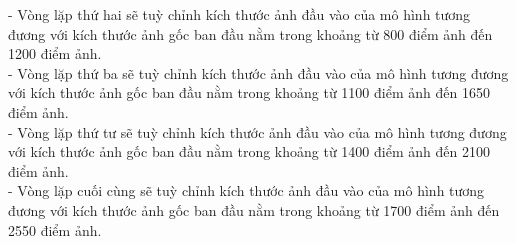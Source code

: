 {    - Vòng lặp thứ hai sẽ tuỳ chỉnh kích thước ảnh đầu vào của mô hình tương đương với kích thước ảnh gốc ban đầu nằm trong khoảng từ 800 điểm ảnh đến 1200 điểm ảnh. \\
    - Vòng lặp thứ ba sẽ tuỳ chỉnh kích thước ảnh đầu vào của mô hình tương đương với kích thước ảnh gốc ban đầu nằm trong khoảng từ 1100 điểm ảnh đến 1650 điểm ảnh. \\
    - Vòng lặp thứ tư sẽ tuỳ chỉnh kích thước ảnh đầu vào của mô hình tương đương với kích thước ảnh gốc ban đầu nằm trong khoảng từ 1400 điểm ảnh đến 2100 điểm ảnh. \\
    - Vòng lặp cuối cùng sẽ tuỳ chỉnh kích thước ảnh đầu vào của mô hình tương đương với kích thước ảnh gốc ban đầu nằm trong khoảng từ 1700 điểm ảnh đến 2550 điểm ảnh.

}
